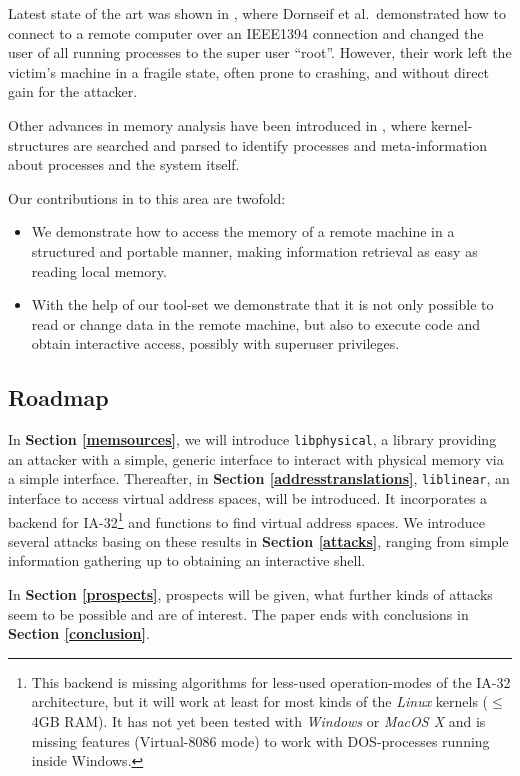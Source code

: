 Latest state of the art was shown in \cite{cansecwest_firewire:2005}, where
Dornseif et al.~demonstrated how to connect to a remote computer over an
IEEE1394 connection and changed the user of all running processes to the super
user ``root''. However, their work left the victim's machine in a fragile state,
often prone to crashing, and without direct gain for the attacker.

Other advances in memory analysis have been introduced in
\cite{finding_digital_evidence_in_physical_memory:2006}, where kernel-structures
are searched and parsed to identify processes and meta-in\-for\-ma\-tion about
processes and the system itself.

Our contributions in to this area are twofold: 

\begin{itemize} 

\item We demonstrate how to access the memory of a remote machine in a
structured and portable manner, making information retrieval as easy as reading
local memory.

\item With the help of our tool-set we demonstrate that it is not only possible
to read or change data in the remote machine, but also to execute code and
obtain interactive access, possibly with superuser privileges.

\end{itemize}

\subsection{Roadmap}

In \textbf{Section \ref{memsources}}, we will introduce \texttt{libphysical}, a
library providing an attacker with a simple, generic interface to interact with
physical memory via a simple interface.  Thereafter, in \textbf{Section
\ref{addresstranslations}}, \texttt{liblinear}, an interface to access virtual
address spaces, will be introduced. It incorporates a backend for
IA-32\footnote{This backend is missing algorithms for less-used operation-modes
of the IA-32 architecture, but it will work at least for most kinds of the
\emph{Linux} kernels ($\leq$ 4GB RAM). It has not yet been tested with
\emph{Windows} or \emph{MacOS X} and is missing features (Virtual-8086 mode) to
work with DOS-processes running inside Windows.} and functions to find virtual
address spaces.  We introduce several attacks basing on these results in
\textbf{Section \ref{attacks}}, ranging from simple information gathering up to
obtaining an interactive shell.

In \textbf{Section \ref{prospects}}, prospects will be given, what further kinds
of attacks seem to be possible and are of interest. The paper ends with
conclusions in \textbf{Section \ref{conclusion}}.

